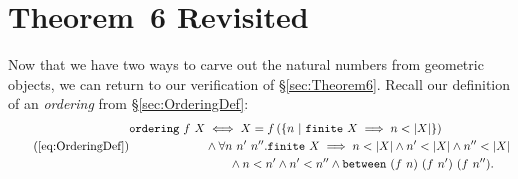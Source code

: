 





\section{Theorem~6 Revisited}
Now that we have two ways to carve out the natural numbers from geometric objects, we can return to our verification of \S\ref{sec:Theorem6}. Recall our definition of an \emph{ordering} from \S\ref{sec:OrderingDef}:
\begin{equation}
  \tag{\ref{eq:OrderingDef}}
  \begin{split}
    \code{ordering}\ f\ X &\iff X = f\left(\left\{n\ \vert\ \code{finite}\ X \implies n < \left|X\right|\right\}\right)\\
    &\wedge \forall n\ n'\ n''. \code{finite}\ X \implies n < \left|X\right| \wedge n' < \left|X\right| \wedge n'' < \left|X\right|\\
    &\qquad\wedge n < n' \wedge n' < n'' \wedge \between{(f\ n)}{(f\ n')}{(f\ n'')}.
    \end{split}
\end{equation}

